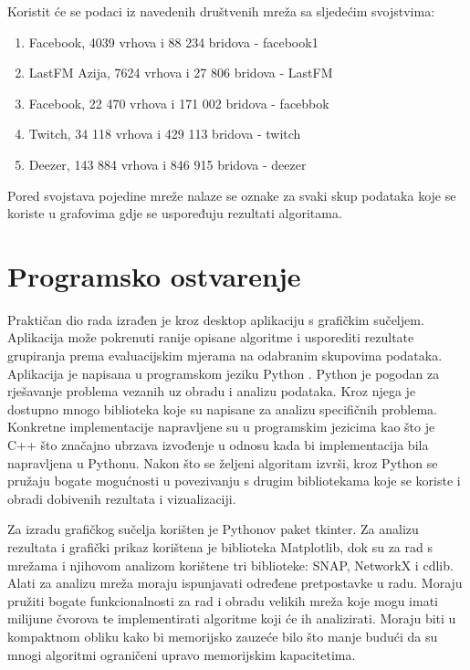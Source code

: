 \documentclass[times, utf8, diplomski]{fer}
\begin{document}
Koristit će se podaci iz navedenih društvenih mreža sa sljedećim svojstvima:
\begin{enumerate}
	\item Facebook, 4039 vrhova i 88 234 bridova - facebook1
	\item LastFM Azija, 7624 vrhova i 27 806 bridova - LastFM
	\item Facebook, 22 470 vrhova i 171 002 bridova - facebbok
	\item Twitch, 34 118 vrhova i 429 113 bridova - twitch
	\item Deezer, 143 884 vrhova i 846 915 bridova - deezer
\end{enumerate}
Pored svojstava pojedine mreže nalaze se oznake za svaki skup podataka koje se koriste u grafovima gdje se uspoređuju rezultati algoritama.



%
\chapter{Programsko ostvarenje}

Praktičan dio rada izrađen je kroz desktop aplikaciju s grafičkim sučeljem. Aplikacija može pokrenuti ranije opisane algoritme i usporediti rezultate grupiranja prema evaluacijskim mjerama na odabranim skupovima podataka. Aplikacija je napisana u programskom jeziku Python \cite{van1995python}. Python je pogodan za rješavanje problema vezanih uz obradu i analizu podataka. Kroz njega je dostupno mnogo biblioteka koje su napisane za analizu specifičnih problema. Konkretne implementacije napravljene su u programskim jezicima kao što je C++ što značajno ubrzava izvođenje u odnosu kada bi implementacija bila napravljena u Pythonu. Nakon što se željeni algoritam izvrši, kroz Python se pružaju bogate mogućnosti u povezivanju s drugim bibliotekama koje se koriste i obradi dobivenih rezultata i vizualizaciji.

Za izradu grafičkog sučelja korišten je Pythonov paket tkinter. Za analizu rezultata i grafički prikaz korištena je biblioteka Matplotlib, dok su za rad s mrežama i njihovom analizom korištene tri biblioteke: SNAP, NetworkX i cdlib. Alati za analizu mreža moraju ispunjavati određene pretpostavke u radu. Moraju pružiti bogate funkcionalnosti za rad i obradu velikih mreža koje mogu imati milijune čvorova te implementirati algoritme koji će ih analizirati. Moraju biti u kompaktnom obliku kako bi memorijsko zauzeće bilo što manje	budući da su mnogi algoritmi ograničeni upravo memorijskim kapacitetima.
\end{document}
